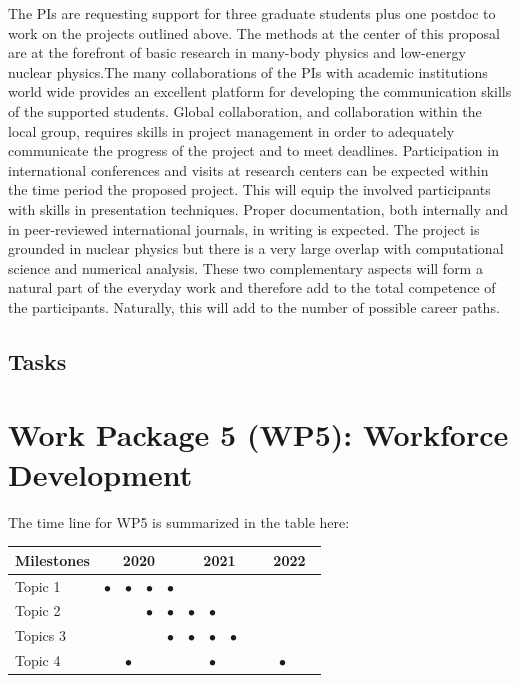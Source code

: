 \documentclass[10pt]{article}
\begin{document}
The PIs are requesting support for three graduate students plus one
postdoc to work on the projects outlined above. The methods at the
center of this proposal are at the forefront of basic research in
many-body physics and low-energy nuclear physics.The many
collaborations of the PIs with academic institutions world wide
provides an excellent platform for developing the communication skills
of the supported students. Global collaboration, and collaboration
within the local group, requires skills in project management in order
to adequately communicate the progress of the project and to meet
deadlines. Participation in international conferences and visits at
research centers can be expected within the time period the proposed
project. This will equip the involved participants with skills in
presentation techniques.  Proper documentation, both internally and in
peer-reviewed international journals, in writing is expected. The
project is grounded in nuclear physics but there is a very large
overlap with computational science and numerical analysis. These two
complementary aspects will form a natural part of the everyday work
and therefore add to the total competence of the
participants. Naturally, this will add to the number of possible
career paths.





\subsection{Tasks}

\section{Work Package 5 (WP5): Workforce Development}

The time line for WP5 is summarized in the table here:
\begin{footnotesize}
\begin{center}
\begin{tabular}{|l|c|c|c|c|c|c|c|c|c|c|c|c|}
\hline
\multicolumn{1}{|l}{Milestones } & \multicolumn{4}{|c|}{ 2020 } & \multicolumn{4}{c|}{ 2021 } & \multicolumn{4}{c|}{ 2022 } \\
\hline
Topic 1 &$\bullet$ &$\bullet$ &$\bullet$ &$\bullet$ & & & & & & & &  \\
\hline
Topic 2 & & &$\bullet$ &$\bullet$ &$\bullet$ &$\bullet$ & & & & & &  \\
\hline
Topics 3 & & & & $\bullet$ &$\bullet$ &$\bullet$ &$\bullet$ & & & & &  \\
\hline
Topic 4 & &$\bullet$ & & & &$\bullet$ & & & &$\bullet$ & &  \\
\hline

\end{tabular}
\end{center}
\end{footnotesize}
\end{document}
